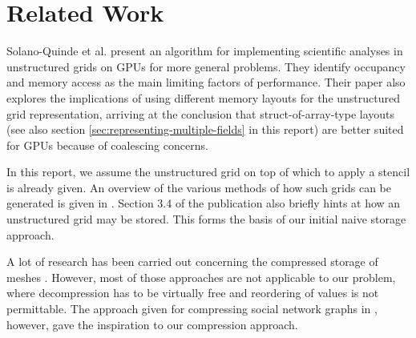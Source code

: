 \chapter*{Related Work}

Solano-Quinde et al. \cite{solano2011} present an algorithm for implementing scientific analyses in unstructured grids on GPUs for more general problems. They identify occupancy and memory access as the main limiting factors of performance. Their paper also explores the implications of using different memory layouts for the unstructured grid representation, arriving at the conclusion that struct-of-array-type layouts (see also section \ref{sec:representing-multiple-fields} in this report) are better suited for GPUs because of coalescing concerns. 

In this report, we assume the unstructured grid on top of which to apply a stencil is already given. An overview of the various methods of how such grids  can be generated is given in \cite{mavriplis1997}. Section 3.4 of the publication also briefly hints at how an unstructured grid may be stored. This forms the basis of our initial naive storage approach.

A lot of research has been carried out concerning the compressed storage of meshes \cite{edgebreaker}\cite{edgebreaker-quadrilateral}. However, most of those approaches are not applicable to our problem, where decompression has to be virtually free and reordering of values is not permittable. The approach given for compressing social network graphs in \cite{social}, however, gave the inspiration to our compression approach.